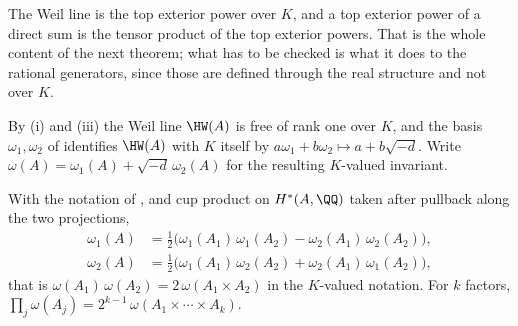 The Weil line is the top exterior power over $K$, and a top exterior power of
a direct sum is the tensor product of the top exterior powers. That is the
whole content of the next theorem; what has to be checked is what it does to
the rational generators, since those are defined through the real structure
and not over $K$.

By (i) and (iii) the Weil line $\HW(A)$ is free of rank
one over $K$, and the basis $\omega_{1},\omega_{2}$ of
 identifies $\HW(A)$ with $K$ itself by
$a\omega_{1}+b\omega_{2}\mapsto a+b\sqrt{-d}$. Write
$\omega(A)=\omega_{1}(A)+\sqrt{-d}\,\omega_{2}(A)$ for the resulting
$K$-valued invariant.

\begin{theorem}\label{thm:weilmult}
With the notation of , and cup product on
$H^{*}(A,\QQ)$ taken after pullback along the two projections,
\begin{equation}\label{eq:weilmult}
\begin{aligned}
  \omega_{1}(A)&=\tfrac12\bigl(\omega_{1}(A_{1})\,\omega_{1}(A_{2})
    -\omega_{2}(A_{1})\,\omega_{2}(A_{2})\bigr),\\
  \omega_{2}(A)&=\tfrac12\bigl(\omega_{1}(A_{1})\,\omega_{2}(A_{2})
    +\omega_{2}(A_{1})\,\omega_{1}(A_{2})\bigr),
\end{aligned}
\end{equation}
that is $\omega(A_{1})\,\omega(A_{2})=2\,\omega(A_{1}\times A_{2})$ in the
$K$-valued notation. For $k$ factors,
$\prod_{j}\omega(A_{j})=2^{k-1}\,\omega(A_{1}\times\cdots\times A_{k})$.
\end{theorem}

